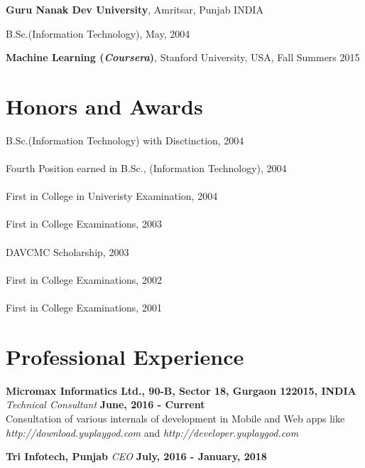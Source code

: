\documentclass[margin,line]{res}
\newenvironment{list1}{
  \begin{list}{\ding{113}}{%
      \setlength{\itemsep}{0in}
      \setlength{\parsep}{0in} \setlength{\parskip}{0in}
      \setlength{\topsep}{0in} \setlength{\partopsep}{0in}
      \setlength{\leftmargin}{0.17in}}}{\end{list}}
\begin{document}
\begin{resume}
{\bf Guru Nanak Dev University}, Amritsar, Punjab INDIA\\
\vspace*{-.1in}
\begin{list1}
\item[] B.Sc.(Information Technology),  May, 2004
\end{list1}

{\bf Machine Learning (\textit{Coursera})}, Stanford University, USA, Fall Summers 2015\\
\vspace*{-.1in}

\section{\sc Honors and Awards}
B.Sc.(Information Technology) with Disctinction, 2004\\\\
Fourth Position earned in B.Sc., (Information Technology), 2004\\\\
First in College in Univeristy Examination, 2004\\\\
First in College Examinations, 2003\\\\
DAVCMC Scholarship, 2003\\\\
First in College Examinations, 2002\\\\
First in College Examinations, 2001\\

\section{\sc Professional Experience}

%
%

{\bf Micromax Informatics Ltd., 90-B, Sector 18, Gurgaon 122015, INDIA}
{\em Technical Consultant} \hfill {\bf June, 2016 - Current}\\
Consultation of various internals of development in Mobile and Web apps like {\em http://download.yuplaygod.com} and {\em http://developer.yuplaygod.com}

{\bf Tri Infotech, Punjab}
{\em CEO} \hfill {\bf July, 2016 - January, 2018}


\end{resume}
\end{document}
